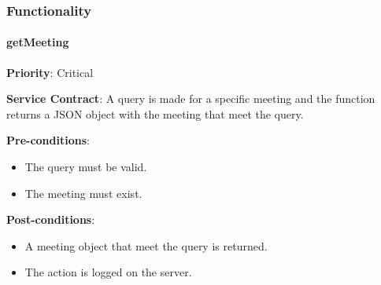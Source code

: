 		
		
		
		\subsubsection{Functionality}
		
		    \paragraph{getMeeting}
			\begin{description}
			    \item{\textbf{Priority}:} Critical%
			    \item{\textbf{Service Contract}:} A query is made for a specific meeting and the function returns a JSON object with the meeting that meet the query. 
			    \item{\textbf{Pre-conditions}:}%
    			    \begin{itemize}
    			        \item The query must be valid.
    			        \item The meeting must exist.
    			    \end{itemize}
			    \item{\textbf{Post-conditions}:} %
    			    \begin{itemize}
    			    \item A meeting object that meet the query is returned. 
    			    \item The action is logged on the server.
    			    \end{itemize}
			\end{description}
	

